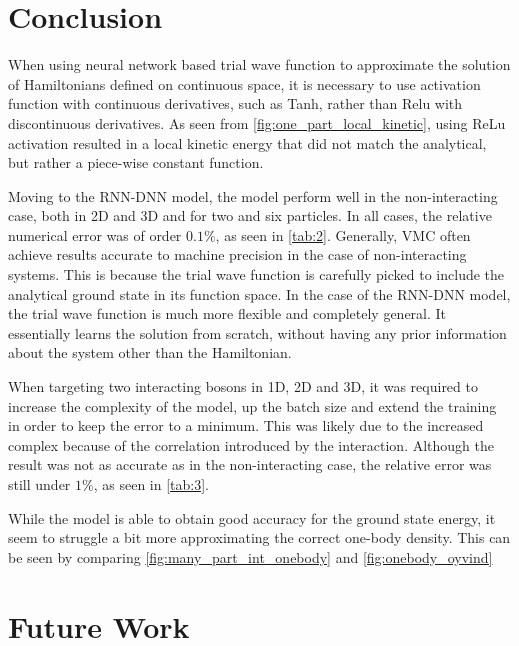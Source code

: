\begin{minipage}{\columnwidth}
\section{Conclusion}\label{sec:Conclusion}
When using neural network based trial wave function to approximate the solution of Hamiltonians defined on continuous space, it is necessary to use activation function with continuous derivatives, such as Tanh, rather than Relu with discontinuous derivatives. As seen from \autoref{fig:one_part_local_kinetic}, using ReLu activation resulted in a local kinetic energy that did not match the analytical, but rather a piece-wise constant function.

Moving to the RNN-DNN model, the model perform well in the non-interacting case, both in 2D and 3D and for two and six particles. In all cases, the relative numerical error was of order $0.1\%$, as seen in \autoref{tab:2}. Generally, VMC often achieve results accurate to machine precision in the case of non-interacting systems. This is because the trial wave function is carefully picked to include the analytical ground state in its function space. In the case of the RNN-DNN model, the trial wave function is much more flexible and completely general. It essentially learns the solution from scratch, without having any prior information about the system other than the Hamiltonian.

When targeting two interacting bosons in 1D, 2D and 3D, it was required to increase the complexity of the model, up the batch size and extend the training in order to keep the error to a minimum. This was likely due to the increased complex because of the correlation introduced by the interaction. Although the result was not as accurate as in the non-interacting case, the relative error was still under $1\%$, as seen in \autoref{tab:3}.

While the model is able to obtain good accuracy for the ground state energy, it seem to struggle a bit more approximating the correct one-body density. This can be seen by comparing \autoref{fig:many_part_int_onebody} and \autoref{fig:onebody_oyvind} 

\end{minipage}

\section{Future Work}
  

